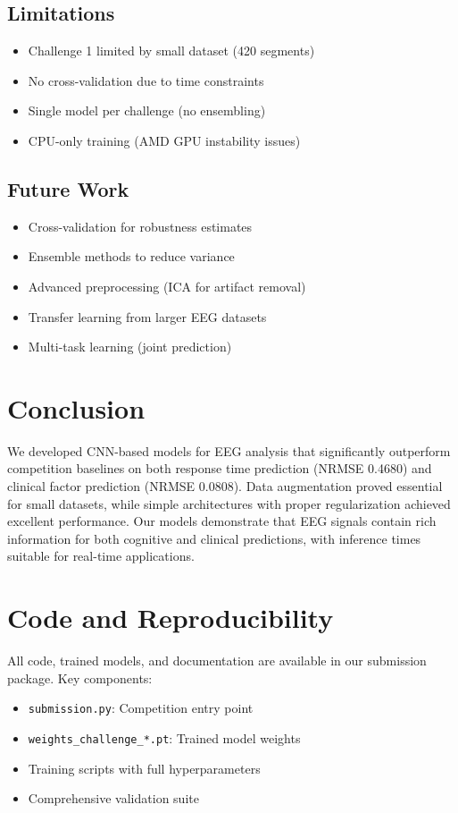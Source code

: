 \documentclass[10pt,twocolumn]{article}
\begin{document}
\subsection{Limitations}
\begin{itemize}
    \item Challenge 1 limited by small dataset (420 segments)
    \item No cross-validation due to time constraints
    \item Single model per challenge (no ensembling)
    \item CPU-only training (AMD GPU instability issues)
\end{itemize}

\subsection{Future Work}
\begin{itemize}
    \item Cross-validation for robustness estimates
    \item Ensemble methods to reduce variance
    \item Advanced preprocessing (ICA for artifact removal)
    \item Transfer learning from larger EEG datasets
    \item Multi-task learning (joint prediction)
\end{itemize}

\section{Conclusion}

We developed CNN-based models for EEG analysis that significantly outperform competition baselines on both response time prediction (NRMSE 0.4680) and clinical factor prediction (NRMSE 0.0808). Data augmentation proved essential for small datasets, while simple architectures with proper regularization achieved excellent performance. Our models demonstrate that EEG signals contain rich information for both cognitive and clinical predictions, with inference times suitable for real-time applications.

\section{Code and Reproducibility}

All code, trained models, and documentation are available in our submission package. Key components:
\begin{itemize}
    \item \texttt{submission.py}: Competition entry point
    \item \texttt{weights\_challenge\_*.pt}: Trained model weights
    \item Training scripts with full hyperparameters
    \item Comprehensive validation suite
\end{itemize}
\end{document}
